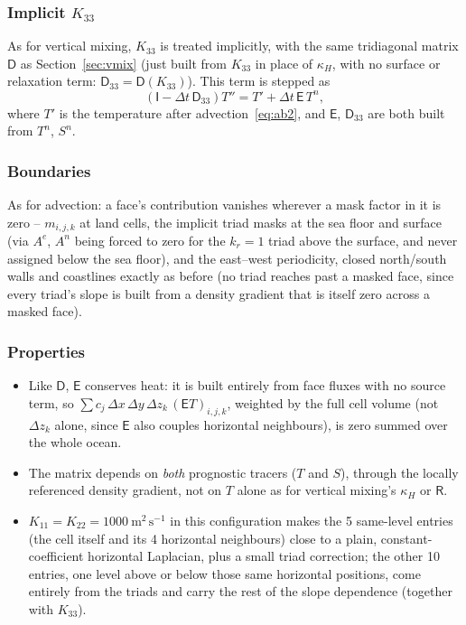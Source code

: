 \documentclass{article}
\begin{document}
\subsubsection*{Implicit $K_{33}$}
As for vertical mixing, $K_{33}$ is treated implicitly, with the same tridiagonal matrix $\mathsf{D}$ as Section~\ref{sec:vmix} (just built from $K_{33}$ in place of $\kappa_H$, with no surface or relaxation term: $\mathsf{D}_{33}=\mathsf{D}(K_{33})$).
This term is stepped as
\[
\left( \mathsf{I} - \Delta t\,\mathsf{D}_{33} \right) T'' = T' + \Delta t\, \mathsf{E}\,T^n,
\]
where $T'$ is the temperature after advection~\eqref{eq:ab2}, and $\mathsf{E}$, $\mathsf{D}_{33}$ are both built from $T^n$, $S^n$.

\subsubsection*{Boundaries}
As for advection: a face's contribution vanishes wherever a mask factor in it is zero -- $m_{i,j,k}$ at land cells, the implicit triad masks at the sea floor and surface (via $A^e$, $A^n$ being forced to zero for the $k_r=1$ triad above the surface, and never assigned below the sea floor), and the east--west periodicity, closed north/south walls and coastlines exactly as before (no triad reaches past a masked face, since every triad's slope is built from a density gradient that is itself zero across a masked face).

\subsubsection*{Properties}
\begin{itemize}
\item Like $\mathsf{D}$, $\mathsf{E}$ conserves heat: it is built entirely from face fluxes with no source term, so $\sum c_j\,\Delta x\,\Delta y\,\Delta z_k\, (\mathsf{E}T)_{i,j,k}$, weighted by the full cell volume (not $\Delta z_k$ alone, since $\mathsf{E}$ also couples horizontal neighbours), is zero summed over the whole ocean.
\item The matrix depends on \emph{both} prognostic tracers ($T$ and $S$), through the locally referenced density gradient, not on $T$ alone as for vertical mixing's $\kappa_H$ or $\mathsf{R}$.
\item $K_{11}=K_{22}=1000~\text{m}^2\,\text{s}^{-1}$ in this configuration makes the 5 same-level entries (the cell itself and its 4 horizontal neighbours) close to a plain, constant-coefficient horizontal Laplacian, plus a small triad correction; the other 10 entries, one level above or below those same horizontal positions, come entirely from the triads and carry the rest of the slope dependence (together with $K_{33}$).
\end{itemize}
\end{document}
